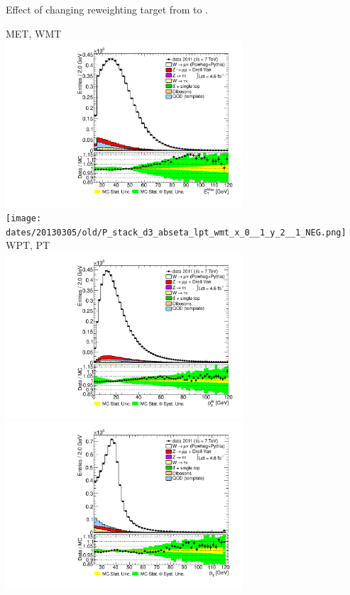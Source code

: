 

{
Effect of changing reweighting target from  to .
}

 {
\colb[T]

MET, WMT \\
\centering
\includegraphics[width=0.66\textwidth]{dates/20130305/old/P_stack_d3_abseta_lpt_met_x_0__1_y_2__1_NEG.pdf} \\
\texttt{[image: dates/20130305/old/P\_stack\_d3\_abseta\_lpt\_wmt\_x\_0\_\_1\_y\_2\_\_1\_NEG.png]}
WPT, PT \\
\centering
\includegraphics[width=0.66\textwidth]{dates/20130305/old/P_stack_d3_abseta_lpt_wpt_x_0__1_y_2__1_NEG} \\
\includegraphics[width=0.66\textwidth]{dates/20130305/old/P_stack_lpt_NEG} 
\cole
}

